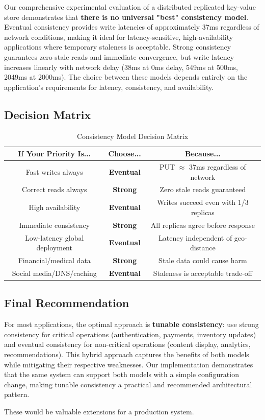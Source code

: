 \documentclass[10pt,a4paper]{article}
\newcommand{\eventual}[1]{\textcolor{eventualcolor}{\textbf{#1}}}
\newcommand{\strongcon}[1]{\textcolor{strongcolor}{\textbf{#1}}}
\begin{document}
Our comprehensive experimental evaluation of a distributed replicated key-value store demonstrates that \textbf{there is no universal "best" consistency model}. Eventual consistency provides write latencies of approximately 37ms regardless of network conditions, making it ideal for latency-sensitive, high-availability applications where temporary staleness is acceptable. Strong consistency guarantees zero stale reads and immediate convergence, but write latency increases linearly with network delay (38ms at 0ms delay, 549ms at 500ms, 2049ms at 2000ms). The choice between these models depends entirely on the application's requirements for latency, consistency, and availability.

\subsection{Decision Matrix}

\begin{table}[H]
\centering
\caption{Consistency Model Decision Matrix}
\begin{tabular}{|c|c|c|}
\hline
\textbf{If Your Priority Is...} & \textbf{Choose...} & \textbf{Because...} \\
\hline
Fast writes always & \eventual{Eventual} & PUT $\approx$ 37ms regardless of network \\
\hline
Correct reads always & \strongcon{Strong} & Zero stale reads guaranteed \\
\hline
High availability & \eventual{Eventual} & Writes succeed even with 1/3 replicas \\
\hline
Immediate consistency & \strongcon{Strong} & All replicas agree before response \\
\hline
Low-latency global deployment & \eventual{Eventual} & Latency independent of geo-distance \\
\hline
Financial/medical data & \strongcon{Strong} & Stale data could cause harm \\
\hline
Social media/DNS/caching & \eventual{Eventual} & Staleness is acceptable trade-off \\
\hline
\end{tabular}
\end{table}

\subsection{Final Recommendation}

For most applications, the optimal approach is \textbf{tunable consistency}: use strong consistency for critical operations (authentication, payments, inventory updates) and eventual consistency for non-critical operations (content display, analytics, recommendations). This hybrid approach captures the benefits of both models while mitigating their respective weaknesses. Our implementation demonstrates that the same system can support both models with a simple configuration change, making tunable consistency a practical and recommended architectural pattern.

These would be valuable extensions for a production system.
\end{document}
